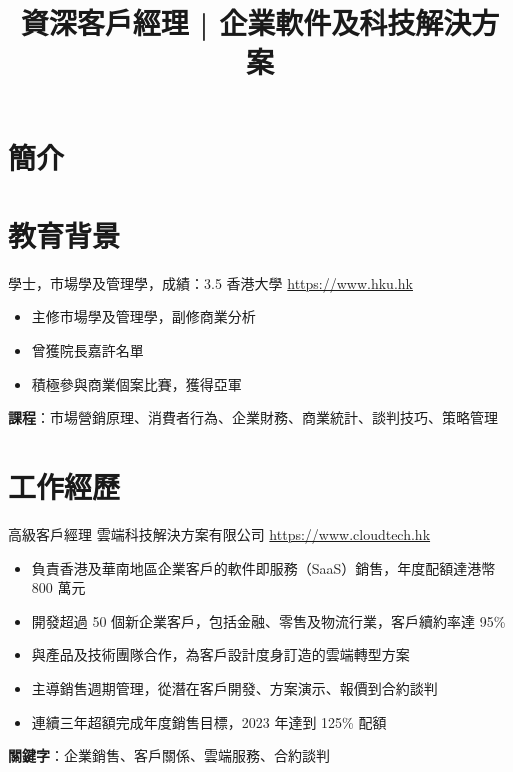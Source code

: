\documentclass[a4paper, serif, 10pt]{moderncv}
\title{資深客戶經理 | 企業軟件及科技解決方案}
\begin{document}
\maketitle

\section{簡介}

\section{教育背景}

        {學士，市場學及管理學，成績：3.5}
        {香港大學}
        {\url{https://www.hku.hk}}
        {}
        {\begin{itemize}
\item 主修市場學及管理學，副修商業分析
\item 曾獲院長嘉許名單
\item 積極參與商業個案比賽，獲得亞軍
\end{itemize}
\textbf{課程}：市場營銷原理、消費者行為、企業財務、商業統計、談判技巧、策略管理}
\section{工作經歷}

        {高級客戶經理}
        {雲端科技解決方案有限公司}
        {\url{https://www.cloudtech.hk}}
        {}
        {\begin{itemize}
\item 負責香港及華南地區企業客戶的軟件即服務（SaaS）銷售，年度配額達港幣 800 萬元
\item 開發超過 50 個新企業客戶，包括金融、零售及物流行業，客戶續約率達 95\%
\item 與產品及技術團隊合作，為客戶設計度身訂造的雲端轉型方案
\item 主導銷售週期管理，從潛在客戶開發、方案演示、報價到合約談判
\item 連續三年超額完成年度銷售目標，2023 年達到 125\% 配額
\end{itemize}
\textbf{關鍵字}：企業銷售、客戶關係、雲端服務、合約談判}
\end{document}
